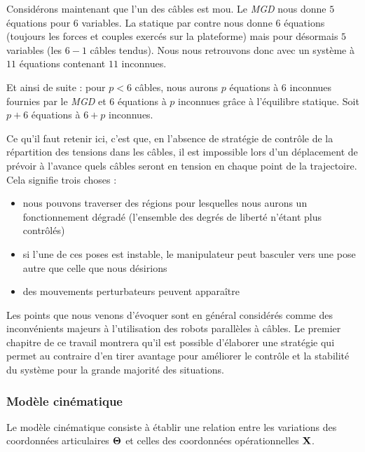 Considérons maintenant que l'un des câbles est mou. Le {\it MGD} nous donne $5$ équations pour $6$ variables. La statique par contre nous donne $6$ équations (toujours les forces et couples exercés sur la plateforme) mais pour désormais $5$ variables (les $6-1$ câbles tendus). Nous nous retrouvons donc avec un système à $11$ équations contenant $11$ inconnues.

Et ainsi de suite : pour $p < 6$ câbles, nous aurons $p$ équations à $6$ inconnues fournies par le {\it MGD} et $6$ équations à $p$ inconnues grâce à l'équilibre statique. Soit $p+6$ équations à $6+p$ inconnues.

Ce qu'il faut retenir ici, c'est que, en l'absence de stratégie de contrôle de la répartition des tensions dans les câbles, il est impossible lors d'un déplacement de prévoir à l'avance quels câbles seront en tension en chaque point de la trajectoire. Cela signifie trois choses :
\begin{itemize}
 \item nous pouvons traverser des régions pour lesquelles nous aurons un fonctionnement dégradé (l'ensemble des degrés de liberté n'étant plus contrôlés)
 \item si l'une de ces poses est instable, le manipulateur peut basculer vers une pose autre que celle que nous désirions
 \item des mouvements perturbateurs peuvent apparaître
\end{itemize}

Les points que nous venons d'évoquer sont en général considérés comme des inconvénients majeurs à l'utilisation des robots parallèles à câbles. Le premier chapitre de ce travail montrera qu'il est possible d'élaborer une stratégie qui permet au contraire d'en tirer avantage pour améliorer le contrôle et la stabilité du système pour la grande majorité des situations.

\subsubsection{Modèle cinématique}

Le modèle cinématique consiste à établir une relation entre les variations des coordonnées articulaires ${\bf \Theta}$ et celles des coordonnées opérationnelles ${\bf X}$.

